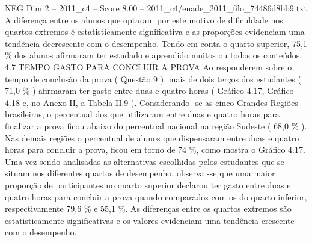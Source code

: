\begin{textsample}{NEG Dim 2 – 2011\_c4 – Score 8.00 – 2011\_c4/enade\_2011\_filo\_74486d8bb9.txt}
A diferença entre os alunos que optaram por este motivo de dificuldade nos quartos extremos é estatisticamente significativa e as proporções evidenciam uma tendência decrescente com o desempenho.
Tendo em conta o quarto superior, 75,1 \% dos alunos afirmaram ter estudado e aprendido muitos ou todos os conteúdos. 4.7 TEMPO GASTO PARA CONCLUIR A PROVA Ao responderem sobre o tempo de conclusão da prova ( Questão 9 ), mais de dois terços dos estudantes ( 71,0 \% ) afirmaram ter gasto entre duas e quatro horas ( Gráfico 4.17, Gráfico 4.18 e, no Anexo II, a Tabela II.9 ).
Considerando -se as cinco Grandes Regiões brasileiras, o percentual dos que utilizaram entre duas e quatro horas para finalizar a prova ficou abaixo do percentual nacional na região Sudeste ( 68,0 \% ).
Nas demais regiões o percentual de alunos que dispensaram entre duas e quatro horas para concluir a prova, ficou em torno de 74 \%, como mostra o Gráfico 4.17.
Uma vez sendo analisadas as alternativas escolhidas pelos estudantes que se situam nos diferentes quartos de desempenho, observa -se que uma maior proporção de participantes no quarto superior declarou ter gasto entre duas e quatro horas para concluir a prova quando comparados com os do quarto inferior, respectivamente 79,6 \% e 55,1 \%.
As diferenças entre os quartos extremos são estatisticamente significativas e os valores evidenciam uma tendência crescente com o desempenho.

\end{textsample}
